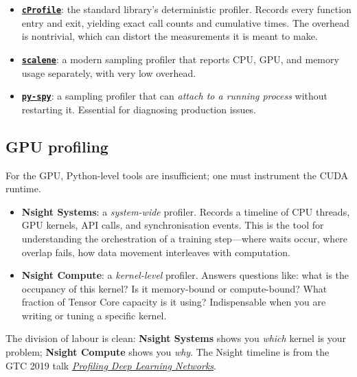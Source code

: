 \documentclass[11pt,a4paper]{article}
\theoremstyle{definition}
\theoremstyle{remark}
\theoremstyle{plain}
\begin{document}
\begin{itemize}[leftmargin=1.5em, itemsep=2pt]
    \item \textbf{\href{https://docs.python.org/3/library/profile.html\#module-cProfile}{\texttt{cProfile}}}:
          the standard library's deterministic profiler. Records every
          function entry and exit, yielding exact call counts and
          cumulative times. The overhead is nontrivial, which can distort
          the measurements it is meant to make.
    \item \textbf{\href{https://github.com/plasma-umass/scalene}{\texttt{scalene}}}:
          a modern sampling profiler that reports CPU, GPU, and memory
          usage separately, with very low overhead.
    \item \textbf{\href{https://github.com/benfred/py-spy}{\texttt{py-spy}}}:
          a sampling profiler that can \emph{attach to a running process}
          without restarting it. Essential for diagnosing production
          issues.
\end{itemize}

\subsection{GPU profiling}

For the GPU, Python-level tools are insufficient; one must instrument the
CUDA runtime.

\begin{itemize}[leftmargin=1.5em, itemsep=2pt]
    \item \textbf{Nsight Systems}: a \emph{system-wide} profiler. Records
          a timeline of CPU threads, GPU kernels, API calls, and
          synchronisation events. This is the tool for understanding the
          orchestration of a training step---where waits occur, where
          overlap fails, how data movement interleaves with computation.
    \item \textbf{Nsight Compute}: a \emph{kernel-level} profiler.
          Answers questions like: what is the occupancy of this kernel?
          Is it memory-bound or compute-bound? What fraction of Tensor
          Core capacity is it using? Indispensable when you are writing
          or tuning a specific kernel.
\end{itemize}

The division of labour is clean: \textbf{Nsight Systems} shows you
\emph{which} kernel is your problem; \textbf{Nsight Compute} shows you
\emph{why}. The Nsight timeline is from the GTC
2019 talk
\href{https://developer.download.nvidia.com/video/gputechconf/gtc/2019/presentation/s9339-profiling-deep-learning-networks.pdf}{\textit{Profiling
Deep Learning Networks}}.
\end{document}
